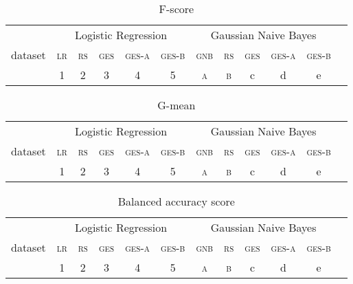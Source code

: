 \documentclass[11pt]{article}
\begin{document}
\begin{table}
\centering
\footnotesize
\begin{tabular}{l|ccccc||cccccc}
	\toprule
  & \multicolumn{5}{c||}{Logistic Regression} & \multicolumn{5}{c}{Gaussian Naive Bayes}\\
  dataset& \textsc{lr} & \textsc{rs} & \textsc{ges} & \textsc{ges-a} & \textsc{ges-b} & \textsc{gnb} & \textsc{rs} & \textsc{ges} & \textsc{ges-a} & \textsc{ges-b}\\
  & 1 & 2 & 3 & 4 & 5 & \textsc{a} & \textsc{b} & c & d & e\\
  \midrule
  
  \bottomrule
\end{tabular}
\caption{F-score}
\end{table}

\begin{table}
\centering
\footnotesize
\begin{tabular}{l|ccccc||cccccc}
	\toprule
  & \multicolumn{5}{c||}{Logistic Regression} & \multicolumn{5}{c}{Gaussian Naive Bayes}\\
  dataset& \textsc{lr} & \textsc{rs} & \textsc{ges} & \textsc{ges-a} & \textsc{ges-b} & \textsc{gnb} & \textsc{rs} & \textsc{ges} & \textsc{ges-a} & \textsc{ges-b}\\
  & 1 & 2 & 3 & 4 & 5 & \textsc{a} & \textsc{b} & c & d & e\\
  \midrule
  
  \bottomrule
\end{tabular}
\caption{G-mean}
\end{table}

\begin{table}
\centering
\footnotesize
\begin{tabular}{l|ccccc||cccccc}
	\toprule
  & \multicolumn{5}{c||}{Logistic Regression} & \multicolumn{5}{c}{Gaussian Naive Bayes}\\
  dataset& \textsc{lr} & \textsc{rs} & \textsc{ges} & \textsc{ges-a} & \textsc{ges-b} & \textsc{gnb} & \textsc{rs} & \textsc{ges} & \textsc{ges-a} & \textsc{ges-b}\\
  & 1 & 2 & 3 & 4 & 5 & \textsc{a} & \textsc{b} & c & d & e\\
  \midrule
  
  \bottomrule
\end{tabular}
\caption{Balanced accuracy score}
\end{table}
\end{document}
